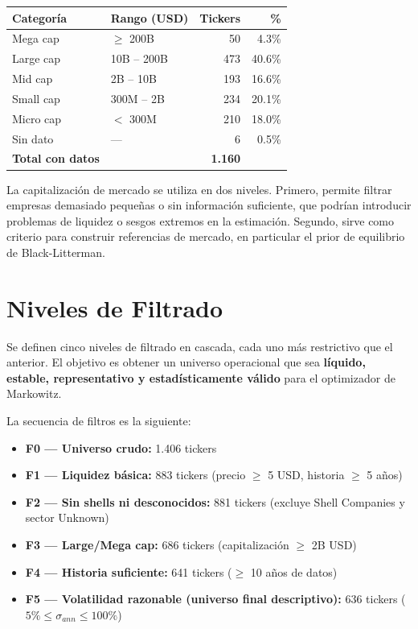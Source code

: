 \begin{center}
\begin{tabular}{llrr}
  \toprule
  \textbf{Categoría} & \textbf{Rango (USD)} & \textbf{Tickers} & \textbf{\%} \\
  \midrule
  Mega cap   & $\geq$ 200B    &  50 &  4.3\% \\
  Large cap  & 10B -- 200B    & 473 & 40.6\% \\
  Mid cap    & 2B -- 10B      & 193 & 16.6\% \\
  Small cap  & 300M -- 2B     & 234 & 20.1\% \\
  Micro cap  & $<$ 300M       & 210 & 18.0\% \\
  \midrule
  Sin dato   & ---            &   6 &  0.5\% \\
  \midrule
  \textbf{Total con datos} & & \textbf{1.160} & \\
  \bottomrule
\end{tabular}
\end{center}

La capitalización de mercado se utiliza en dos niveles. Primero, permite
filtrar empresas demasiado pequeñas o sin información suficiente, que podrían
introducir problemas de liquidez o sesgos extremos en la estimación. Segundo,
sirve como criterio para construir referencias de mercado, en particular el
prior de equilibrio de Black-Litterman.

\section*{Niveles de Filtrado}

Se definen cinco niveles de filtrado en cascada, cada uno más restrictivo
que el anterior. El objetivo es obtener un universo operacional que sea
\textbf{líquido, estable, representativo y estadísticamente válido}
para el optimizador de Markowitz.

La secuencia de filtros es la siguiente:

\begin{itemize}
  \item \textbf{F0 --- Universo crudo:} 1.406 tickers
  \item \textbf{F1 --- Liquidez básica:} 883 tickers (precio $\geq$ 5 USD, historia $\geq$ 5 años)
  \item \textbf{F2 --- Sin shells ni desconocidos:} 881 tickers (excluye Shell Companies y sector Unknown)
  \item \textbf{F3 --- Large/Mega cap:} 686 tickers (capitalización $\geq$ 2B USD)
  \item \textbf{F4 --- Historia suficiente:} 641 tickers ($\geq$ 10 años de datos)
  \item \textbf{F5 --- Volatilidad razonable (universo final descriptivo):} 636 tickers ($5\% \leq \sigma_{ann} \leq 100\%$)
\end{itemize}

